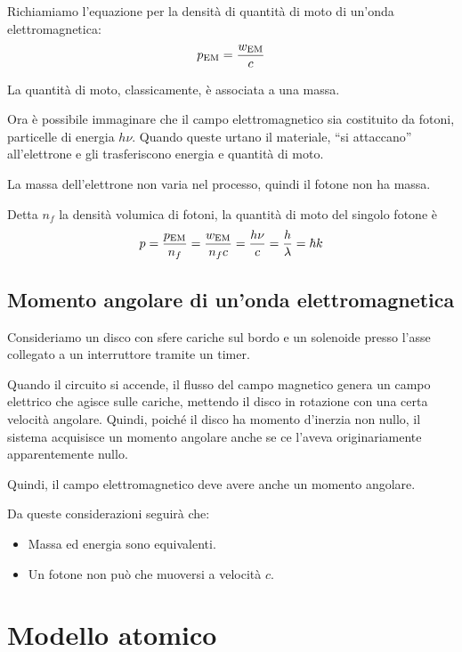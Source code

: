 Richiamiamo l'equazione per la densità di quantità di moto di un'onda elettromagnetica:
\begin{equation}
    p_\mathrm{EM}  = \frac{w_\mathrm{EM}}{c}
\end{equation}

La quantità di moto, classicamente, è associata a una massa.

Ora è possibile immaginare che il campo elettromagnetico sia costituito da fotoni, particelle di energia $h \nu$.
Quando queste urtano il materiale, ``si attaccano'' all'elettrone e gli trasferiscono energia e quantità di moto.

La massa dell'elettrone non varia nel processo, quindi il fotone non ha massa.

Detta $n_f$ la densità volumica di fotoni, la quantità di moto del singolo fotone è
\begin{equation}
\label{eq:momento_fotone}
    p = \frac{p_\mathrm{EM}}{n_f} = \frac{w_\mathrm{EM}}{n_f c} = \frac{h \nu}{c} = \frac{h}{\lambda} = \hbar k
\end{equation}

\subsection{Momento angolare di un'onda elettromagnetica}

Consideriamo un disco con sfere cariche sul bordo e un solenoide presso l'asse collegato a un interruttore tramite un timer.

Quando il circuito si accende, il flusso del campo magnetico genera un campo elettrico che agisce sulle cariche, mettendo il disco in rotazione con una certa velocità angolare.
Quindi, poiché il disco ha momento d'inerzia non nullo, il sistema acquisisce un momento angolare anche se ce l'aveva originariamente apparentemente nullo.

Quindi, il campo elettromagnetico deve avere anche un momento angolare.

Da queste considerazioni seguirà che:
\begin{itemize}
    \item Massa ed energia sono equivalenti.
    \item Un fotone non può che muoversi a velocità $c$.
\end{itemize}


\section{Modello atomico}

